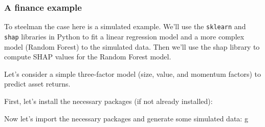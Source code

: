 \documentclass[
  letterpaper,
  DIV=11,
  numbers=noendperiod]{scrartcl}
\begin{document}
\hypertarget{a-finance-example}{%
\subsubsection{A finance example}\label{a-finance-example}}

To steelman the case here is a simulated example. We'll use the
\texttt{sklearn} and \texttt{shap} libraries in Python to fit a linear
regression model and a more complex model (Random Forest) to the
simulated data. Then we'll use the shap library to compute SHAP values
for the Random Forest model.

Let's consider a simple three-factor model (size, value, and momentum
factors) to predict asset returns.

First, let's install the necessary packages (if not already installed):

Now let's import the necessary packages and generate some simulated
data: g
\end{document}
